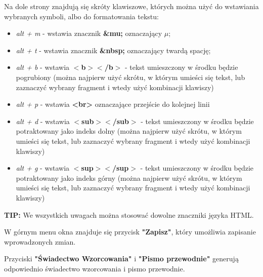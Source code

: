 	Na dole strony znajdują się skróty klawiszowe, których można użyć do wstawiania wybranych symboli, albo do formatowania tekstu:
	\begin{itemize}
		\item\textit{alt + m} - wstawia znacznik \textbf{\&mu;} oznaczający  $\mu$;
		\item\textit{alt + t} - wstawia znacznik \textbf{\&nbsp;} oznaczający twardą spację;
		\item\textit{alt + b} - wstawia \textbf{$<$b$>$$<$/b$>$} - tekst umieszczony w środku będzie pogrubiony (można najpierw użyć skrótu, w którym umieści się tekst, lub zaznaczyć wybrany fragment i wtedy użyć kombinacji klawiszy)
		\item\textit{alt + p} - wstawia \textbf{<br>} oznaczające przejście do kolejnej linii
		\item\textit{alt + d} - wstawia \textbf{$<$sub$>$$<$/sub$>$} - tekst umieszczony w środku będzie potraktowany jako indeks dolny (można najpierw użyć skrótu, w którym umieści się tekst, lub zaznaczyć wybrany fragment i wtedy użyć kombinacji klawiszy)
		\item\textit{alt + g} - wstawia \textbf{$<$sup$>$$<$/sup$>$} - tekst umieszczony w środku będzie potraktowany jako indeks górny (można najpierw użyć skrótu, w którym umieści się tekst, lub zaznaczyć wybrany fragment i wtedy użyć kombinacji klawiszy)
	\end{itemize}

	\textbf{TIP:} We wszystkich uwagach można stosować dowolne znaczniki języka HTML.

	W górnym menu okna znajduje się przycisk \textbf{"Zapisz"}, który umożliwia zapisanie wprowadzonych zmian.
	
	Przyciski \textbf{"Świadectwo Wzorcowania"} i \textbf{"Pismo przewodnie"} generują odpowiednio świadectwo wzorcowania i pismo przewodnie.